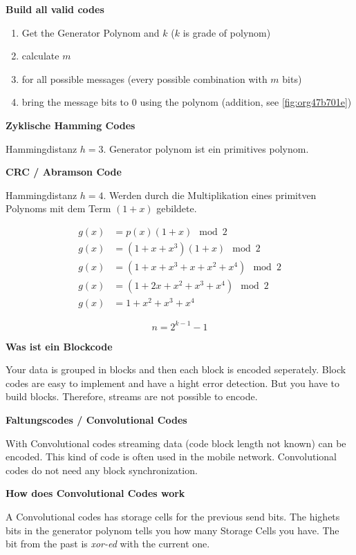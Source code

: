 \documentclass[11pt,twoside,twocolumn,landscape]{article}
\begin{document}
\textbf{Build all valid codes}
\begin{enumerate}
\item Get the Generator Polynom and \(k\) (\(k\) is grade of polynom)
\item calculate \(m\)
\item for all possible messages (every possible combination with \(m\) bits)
\item bring the message bits to \(0\) using the polynom (addition, see \ref{fig:org47b701e})
\end{enumerate}


\textbf{Zyklische Hamming Codes}

Hammingdistanz \(h = 3\).
Generator polynom ist ein primitives polynom.

\textbf{CRC / Abramson Code}

Hammingdistanz \(h = 4\).
Werden durch die Multiplikation eines primitven Polynoms mit dem Term \((1 + x)\) gebildete.

\begin{align}
g(x) &= p(x)(1+x) \mod 2\\
g(x) &= (1+x+x^3)(1+x) \mod 2 \\
g(x) &= (1+x+x^3 + x + x^2 + x^4) \mod 2\\
g(x) &= (1+2x+x^2+x^3+x^4) \mod 2 \\
g(x) &= 1 + x^2 + x^3 + x^4
\end{align}

\begin{equation}
n = 2^{k-1} - 1
\end{equation}

\textbf{Was ist ein Blockcode}

Your data is grouped in blocks and then each block is encoded seperately.
Block codes are easy to implement and have a hight error detection.
But you have to build blocks.
Therefore, streams are not possible to encode.

\textbf{Faltungscodes / Convolutional Codes}

With Convolutional codes streaming data (code block length not known) can be encoded.
This kind of code is often used in the mobile network.
Convolutional codes do not need any block synchronization.

\textbf{How does Convolutional Codes work}

A Convolutional codes has storage cells for the previous send bits.
The highets bits in the generator polynom tells you how many Storage Cells you have.
The bit from the past is \emph{xor-ed} with the current one.
\end{document}

